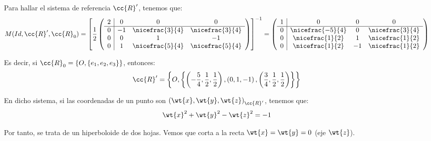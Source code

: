 \begin{ejercicio}
\begin{enumerate}
        Para hallar el sistema de referencia $\cc{R}'$, tenemos que:
        \begin{equation*}
            M(Id, \cc{R}', \cc{R}_0) = \left[\frac{1}{2}\left(\begin{array}{c|ccc}
                2 & 0 & 0 & 0 \\ \hline
                0 & -1 & \nicefrac{3}{4} & \nicefrac{3}{4} \\
                0 & 0 & 1 & -1 \\
                0 & 1 & \nicefrac{5}{4} & \nicefrac{5}{4}
            \end{array}\right)\right]^{-1}
            = \left(\begin{array}{c|ccc}
                1 & 0 & 0 & 0 \\ \hline
                0 & \nicefrac{-5}{4} & 0 & \nicefrac{3}{4} \\
                0 & \nicefrac{1}{2} & 1 & \nicefrac{1}{2} \\
                0 & \nicefrac{1}{2} & -1 & \nicefrac{1}{2}
            \end{array}\right)
        \end{equation*}
        

        Es decir, si $\cc{R}_0 = \{O, \{e_1,e_2,e_3\}\}$, entonces:
        \begin{equation*}
            \cc{R}' = \left\{O, \left\{\left(-\frac{5}{4}, \frac{1}{2}, \frac{1}{2}\right), \left(0,1,-1\right), \left(\frac{3}{4}, \frac{1}{2}, \frac{1}{2}\right)\right\}\right\}
        \end{equation*}

        En dicho sistema, si las coordenadas de un punto son ${(\wt{x}, \wt{y}, \wt{z})}_{\cc{R}'}$, tenemos que:
        \begin{equation*}
            \wt{x}^2 + \wt{y}^2 - \wt{z}^2 = -1
        \end{equation*}

        Por tanto, se trata de un hiperboloide de dos hojas. Vemos que corta a la recta $\wt{x}=\wt{y}=0$ (eje $\wt{z}$).
    \end{enumerate}
\end{ejercicio}


